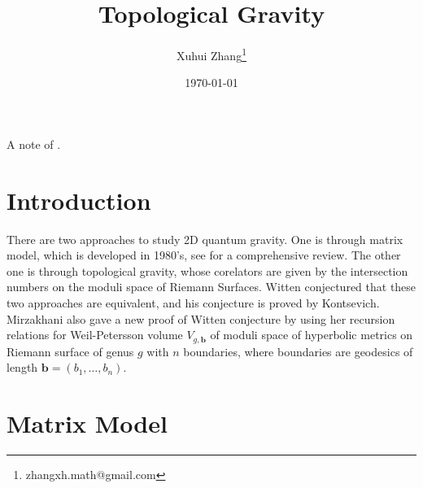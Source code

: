 \documentclass[10pt,reqno,draft]{article}
\title{Topological Gravity}
\author[1]{Xuhui Zhang\thanks{zhangxh.math@gmail.com}}
\affil[1]{Department of Mathematical Science, Tsinghua University}
\date{\today}
\numberwithin{equation}{section}
\numberwithin{figure}{section}
\numberwithin{table}{section}
\theoremstyle{plain}
\theoremstyle{definition}
\theoremstyle{remark}
\begin{document}
    \maketitle
    A note of \cite{dijkgraafDevelopmentsTopologicalGravity2018}.
    \section{Introduction}
    There are two approaches to study 2D quantum gravity. One is through matrix model, which is developed in 1980's, see \cite{francesco2DGravityRandom1995} for a comprehensive review. The other one is through topological gravity, whose corelators are given by the intersection numbers on the moduli space of Riemann Surfaces. Witten conjectured that these two approaches are equivalent\cite{wittenStructureTopologicalPhase1990,wittenTwodimensionalGravityIntersection1990}, and his conjecture is proved by Kontsevich\cite{kontsevichIntersectionTheoryModuli1992}. Mirzakhani also gave a new proof of Witten conjecture by using her recursion relations for Weil-Petersson volume \(V_{g,\boldsymbol{b}}\) of moduli space of hyperbolic metrics on Riemann surface of genus \(g\) with \(n\) boundaries, where boundaries are geodesics of length \(\boldsymbol{b}=(b_1,\dots ,b_{n})\).
    \section{Matrix Model}
    




    
    
\end{document}
